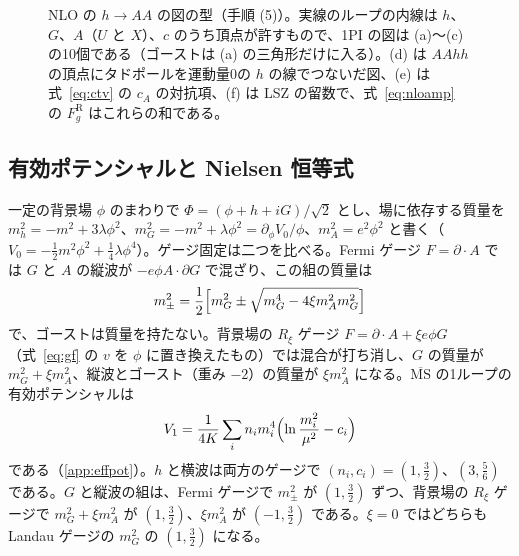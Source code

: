 \documentclass[a4paper,10pt]{ltjsarticle}
\newcommand{\MSbar}{\overline{\mathrm{MS}}}
\begin{document}
\begin{figure}[tbp]
\caption{NLO の $h\to AA$ の図の型（手順 (5)）。実線のループの内線は $h$、$G$、$A$（$U$ と $X$）、$c$ のうち頂点が許すもので、1PI の図は (a)〜(c) の10個である（ゴーストは (a) の三角形だけに入る）。(d) は $AAhh$ の頂点にタドポールを運動量0の $h$ の線でつないだ図、(e) は式~\eqref{eq:ctv} の $c_A$ の対抗項、(f) は LSZ の留数で、式~\eqref{eq:nloamp} の $F_g^{\mathrm R}$ はこれらの和である。}
\label{fig:nlodiag}
\end{figure}

\subsection{有効ポテンシャルと Nielsen 恒等式}\label{sec:effpot}

一定の背景場 $\phi$ のまわりで $\Phi=(\phi+h+iG)/\sqrt2$ とし、場に依存する質量を $m_h^2=-m^2+3\lambda\phi^2$、$m_G^2=-m^2+\lambda\phi^2=\partial_\phi V_0/\phi$、$m_A^2=e^2\phi^2$ と書く（$V_0=-\frac12m^2\phi^2+\frac14\lambda\phi^4$）。ゲージ固定は二つを比べる。Fermi ゲージ $F=\partial\!\cdot\!A$ では $G$ と $A$ の縦波が $-e\phi A\!\cdot\!\partial G$ で混ざり、この組の質量は
\begin{equation*}
m_\pm^2=\frac12\Bigl[m_G^2\pm\sqrt{m_G^4-4\xi m_A^2m_G^2}\Bigr]
\end{equation*}
で、ゴーストは質量を持たない。背景場の $R_\xi$ ゲージ $F=\partial\!\cdot\!A+\xi e\phi G$（式~\eqref{eq:gf} の $v$ を $\phi$ に置き換えたもの）では混合が打ち消し、$G$ の質量が $m_G^2+\xi m_A^2$、縦波とゴースト（重み $-2$）の質量が $\xi m_A^2$ になる。$\MSbar$ の1ループの有効ポテンシャルは
\begin{equation}
V_1=\frac1{4K}\sum_in_im_i^4\Bigl(\ln\frac{m_i^2}{\mu^2}-c_i\Bigr)
\label{eq:V1}
\end{equation}
である（\ref{app:effpot}）。$h$ と横波は両方のゲージで $(n_i,c_i)=(1,\frac32)$、$(3,\frac56)$ である。$G$ と縦波の組は、Fermi ゲージで $m_\pm^2$ が $(1,\frac32)$ ずつ、背景場の $R_\xi$ ゲージで $m_G^2+\xi m_A^2$ が $(1,\frac32)$、$\xi m_A^2$ が $(-1,\frac32)$ である。$\xi=0$ ではどちらも Landau ゲージの $m_G^2$ の $(1,\frac32)$ になる。
\end{document}
